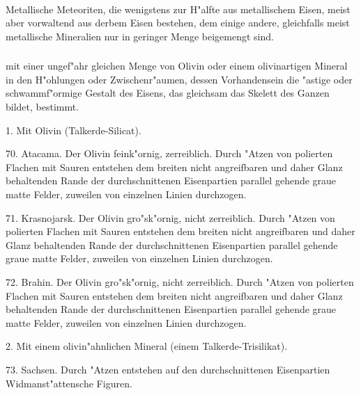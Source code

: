 \documentclass[a4paper, 11pt, oneside, polutonikogreek, german]{article}
\begin{document}
\paragraph{}
Metallische Meteoriten, die wenigstens zur H"alfte aus metallischem Eisen, meist aber vorwaltend aus derbem Eisen bestehen, dem einige andere, gleichfalls meist metallische Mineralien nur in geringer Menge beigemengt sind.
\subsubsection[\swabfamily {"Astiges Meteoreisen.}]{}
mit einer ungef"ahr gleichen Menge von Olivin oder einem olivinartigen Mineral in den H"ohlungen oder Zwischenr"aumen, dessen Vorhandensein die "astige oder schwammf"ormige Gestalt des Eisens, das gleichsam das Skelett des Ganzen bildet, bestimmt.

\vspace{2ex}

1. Mit Olivin (Talkerde-Silicat).

\vspace{2ex}

70. Atacama. Der Olivin feink"ornig, zerreiblich. Durch "Atzen von polierten Flachen mit Sauren entstehen dem breiten nicht angreifbaren und daher Glanz behaltenden Rande der durchschnittenen Eisenpartien parallel gehende graue matte Felder, zuweilen von einzelnen Linien durchzogen.

71. Krasnojarsk. Der Olivin gro"sk"ornig, nicht zerreiblich. Durch "Atzen von polierten Flachen mit Sauren entstehen dem breiten nicht angreifbaren und daher Glanz behaltenden Rande der durchschnittenen Eisenpartien parallel gehende graue matte Felder, zuweilen von einzelnen Linien durchzogen.

72. Brahin. Der Olivin gro"sk"ornig, nicht zerreiblich. Durch "Atzen von polierten Flachen mit Sauren entstehen dem breiten nicht angreifbaren und daher Glanz behaltenden Rande der durchschnittenen Eisenpartien parallel gehende graue matte Felder, zuweilen von einzelnen Linien durchzogen.

\vspace{2ex}

2. Mit einem olivin"ahnlichen Mineral (einem Talkerde-Trisilikat).

\vspace{2ex}

73. Sachsen. Durch "Atzen entstehen auf den durchschnittenen Eisenpartien Widmanst"attensche Figuren.
\end{document}
